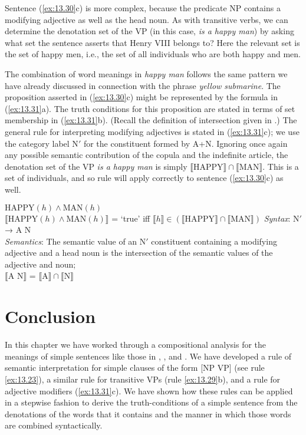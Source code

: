 Sentence (\ref{ex:13.30}c) is more complex, because the predicate NP contains a modifying adjective as well as the head noun. As with transitive verbs, we can determine the denotation set of the VP (in this case, \textit{is a happy man}) by asking what set the sentence asserts that Henry VIII belongs to? Here the relevant set is the set of happy men, i.e., the set of all individuals who are both happy and men.\largerpage



The combination of word meanings in \textit{happy man} follows the same pattern we have already discussed in connection with the phrase \textit{yellow submarine}. The proposition asserted in (\ref{ex:13.30}c) might be represented by the formula in (\ref{ex:13.31}a). The truth conditions for this proposition are stated in terms of set membership in (\ref{ex:13.31}b). (Recall the definition of intersection given in .) The general rule for interpreting modifying adjectives is stated in (\ref{ex:13.31}c); we use the category label N$'$ for the constituent formed by A+N. Ignoring once again any possible semantic contribution of the copula and the indefinite article, the denotation set of the VP \textit{is a happy man} is simply $\llbracket\text{HAPPY}\rrbracket \cap \llbracket\text{MAN}\rrbracket$. This is a set of individuals, and so rule  will apply correctly to sentence (\ref{ex:13.30}c) as well.


\ea \label{ex:13.31}
\ea  $\text{HAPPY}(h) \wedge \text{MAN}(h)$\\
\ex  $\llbracket\text{HAPPY}(h) \wedge \text{MAN}(h)\rrbracket$  = ‘true’  iff  $\llbracket h\rrbracket \in (\llbracket\text{HAPPY}\rrbracket \cap \llbracket\text{MAN}\rrbracket)$
\ex  \textit{Syntax}: N$'$ →  A N\\
     \textit{Semantics}: The semantic value of an N$'$ constituent containing a modifying adjective and a head noun is the intersection of the semantic values of the adjective and noun;\\
{}$\llbracket\text{A N}\rrbracket$  =  $\llbracket\text{A}\rrbracket \cap \llbracket\text{N}\rrbracket$ 
\z \z

\section{Conclusion}\label{sec:13.6}

In this chapter we have worked through a compositional analysis for the meanings of simple sentences like those in , , and . We have developed a rule of semantic interpretation for simple clauses of the form [NP VP] (see rule \ref{ex:13.23}), a similar rule for transitive VPs (rule \ref{ex:13.29}b), and a rule for adjective modifiers (\ref{ex:13.31}c). We have shown how these rules can be applied in a stepwise fashion to derive the truth-conditions of a simple sentence from the denotations of the words that it contains and the manner in which those words are combined syntactically.



